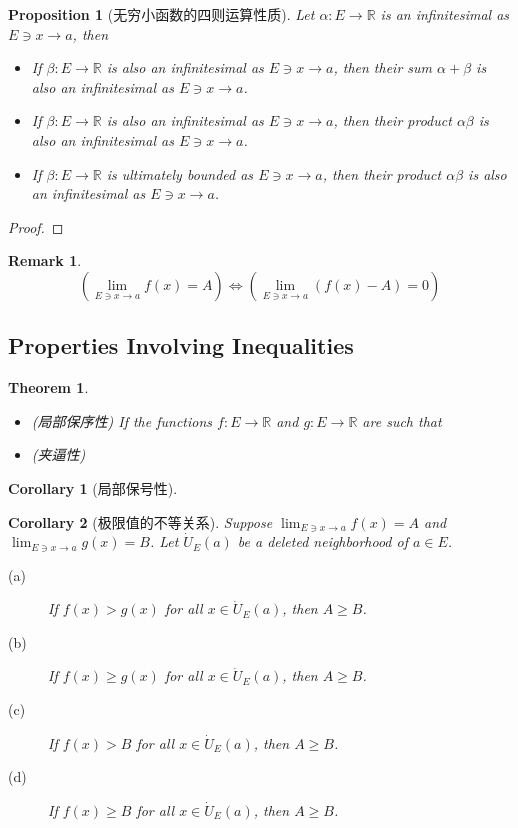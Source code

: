 \documentclass[onecolumn]{ctexart}
\newtheorem{theorem}{Theorem}
\newtheorem{proposition}{Proposition}
\newtheorem{corollary}{Corollary}
\newtheorem{remark}{Remark}
\begin{document}
\begin{proposition}[无穷小函数的四则运算性质]
  Let $\alpha: E \to \mathbb{R}$ is an infinitesimal as $E \owns x \to a$, then
  \begin{itemize}
    \item If $\beta: E \to \mathbb{R}$ is also an infinitesimal as $E \owns x 
    \to a$, then their sum $\alpha + \beta$ is also an infinitesimal as $E \owns 
    x \to a$.
    \item If $\beta: E \to \mathbb{R}$ is also an infinitesimal as $E \owns x 
    \to a$, then their product $\alpha \beta$ is also an infinitesimal as $E 
    \owns x \to a$.
    \item If $\beta: E \to \mathbb{R}$ is ultimately bounded as $E \owns x \to a$,
    then their product $\alpha \beta$ is also an infinitesimal as $E \owns x \to 
    a$. 
  \end{itemize}
\end{proposition}
\begin{proof}
  
\end{proof}
\begin{remark}
  \begin{equation}
    (\lim_{E \owns x \to a} f(x) = A) \Leftrightarrow (\lim_{E \owns x \to a} (f(x) - A) = 0)
  \end{equation}
\end{remark}
\subsection{Properties Involving Inequalities}

\begin{theorem}
  \begin{itemize}
    \item (局部保序性) If the functions $f: E \to \mathbb{R}$ and $g: E \to \mathbb{R}$ are such that 
    \item (夹逼性)
  \end{itemize}
\end{theorem}

\begin{corollary}[局部保号性]
  
\end{corollary}

\begin{corollary}[极限值的不等关系]
  Suppose $\lim_{E \owns x \to a} f(x) = A$ and $\lim_{E \owns x \to a} g(x) = 
  B$. Let $\dot{U}_E(a)$ be a deleted neighborhood of $a \in E$.
  \begin{description}
    \item[(a)] If $f(x) > g(x)$ for all $x \in \dot{U}_E(a)$, then $A \geq B$.
    \item[(b)] If $f(x) \geq g(x)$ for all $x \in \dot{U}_E(a)$, then $A \geq B$.
    \item[(c)] If $f(x) > B$ for all $x \in \dot{U}_E(a)$, then $A \geq B$.
    \item[(d)] If $f(x) \geq B$ for all $x \in \dot{U}_E(a)$, then $A \geq B$.
  \end{description}
\end{corollary}
\end{document}
